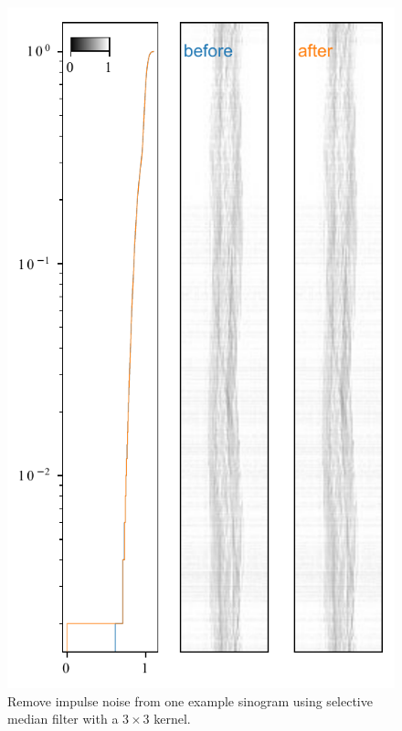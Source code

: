 \documentclass[12pt]{scrartcl}
\newcommand{\myscale}{1}
\begin{document}
\renewcommand{\myscale}{1}
\begin{figure}[htp]
\centering
\includegraphics[scale=\myscale]{sinogramDenoise_retouched}
\caption{
Remove impulse noise from one example sinogram using selective median filter with a $3\times3$ kernel.
}\label{fig: noise reduction}
\end{figure}
\end{document}
